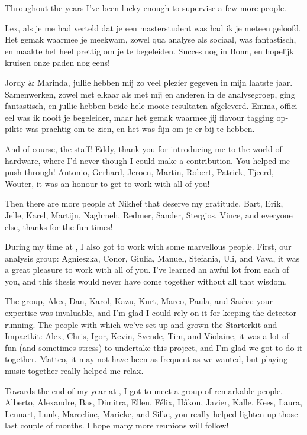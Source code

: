 Throughout the years I've been lucky enough to supervise a few more people.
\begin{otherlanguage}{dutch}
Lex, als je me had verteld dat je een masterstudent was had ik je meteen geloofd.
Het gemak waarmee je meekwam, zowel qua analyse als sociaal, was fantastisch, en maakte het heel prettig om je te begeleiden.
Succes nog in Bonn, en hopelijk kruisen onze paden nog eens!

Jordy \& Marinda, jullie hebben mij zo veel plezier gegeven in mijn laatste jaar.
Samenwerken, zowel met elkaar als met mij en anderen in de analysegroep, ging fantastisch, en jullie hebben beide hele mooie resultaten afgeleverd.
Emma, officieel was ik nooit je begeleider, maar het gemak waarmee jij flavour tagging oppikte was prachtig om te zien, en het was fijn om je er bij te hebben.
\end{otherlanguage}

And of course, the staff!
Eddy, thank you for introducing me to the world of hardware, where I'd never though I could make a contribution.
You helped me push through!
Antonio, Gerhard, Jeroen, Martin, Robert, Patrick, Tjeerd, Wouter, it was an honour to get to work with all of you!

Then there are more people at Nikhef that deserve my gratitude.
Bart, Erik, Jelle, Karel, Martijn, Naghmeh, Redmer, Sander, Stergios, Vince, and everyone else, thanks for the fun times!

During my time at \cern, I also got to work with some marvellous people.
First, our analysis group: Agnieszka, Conor, Giulia, Manuel, Stefania, Uli, and Vava, it was a great pleasure to work with all of you.
I've learned an awful lot from each of you, and this thesis would never have come together without all that wisdom.

The \velo group, Alex, Dan, Karol, Kazu, Kurt, Marco, Paula, and Sasha: your expertise was invaluable, and I'm glad I could rely on it for keeping the detector running.
The people with which we've set up and grown the Starterkit and Impactkit: Alex, Chris, Igor, Kevin, Svende, Tim, and Violaine, it was a lot of fun (and sometimes stress) to undertake this project, and I'm glad we got to do it together.
Matteo, it may not have been as frequent as we wanted, but playing music together really helped me relax.

Towards the end of my year at \cern, I got to meet a group of remarkable people.
Alberto, Alexandre, Bas, Dimitra, Ellen, Félix, Håkon, Javier, Kalle, Kees, Laura, Lennart, Luuk, Marceline, Marieke, and Silke, you really helped lighten up those last couple of months.
I hope many more reunions will follow!


